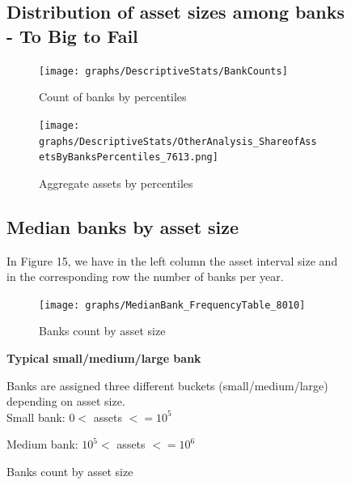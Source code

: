 \documentclass[12pt, a4paper]{article} %
\begin{document}
\begin{figure}[hbtp]
\newpage

\subsection{Distribution of asset sizes among banks - To Big to Fail}

\begin{figure}[hbtp]
\centering
\caption{Count of banks by percentiles}
\texttt{[image: graphs/DescriptiveStats/BankCounts]}
\end{figure}

\newpage

\begin{figure}[hbtp]
\centering
\caption{Aggregate assets by percentiles}
\texttt{[image: graphs/DescriptiveStats/OtherAnalysis\_ShareofAssetsByBanksPercentiles\_7613.png]}
\end{figure}

\subsection{Median banks by asset size}

In Figure 15, we have in the left column the asset interval size and in the corresponding row the number of banks per year.\\

\begin{figure}[hbtp]
\centering
\caption{Banks count by asset size}
\texttt{[image: graphs/MedianBank\_FrequencyTable\_8010]}
\end{figure}


\textbf{Typical small/medium/large bank}

Banks are assigned three different buckets (small/medium/large) depending on asset size.\\

Small bank: $0<$ assets $<= 10^5$

Medium bank: $10^5<$ assets $<= 10^6$


\end{figure}
\end{document}
